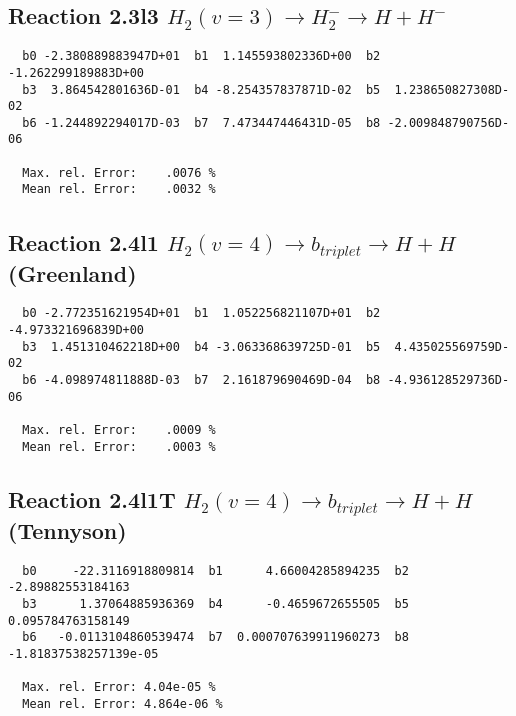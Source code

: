 \documentclass[12pt]{article}
\begin{document}
\subsection{
Reaction 2.3l3
 $ H_2(v=3) \rightarrow H_2^- \rightarrow H + H^-$
}


\begin{small}\begin{verbatim}
  b0 -2.380889883947D+01  b1  1.145593802336D+00  b2 -1.262299189883D+00
  b3  3.864542801636D-01  b4 -8.254357837871D-02  b5  1.238650827308D-02
  b6 -1.244892294017D-03  b7  7.473447446431D-05  b8 -2.009848790756D-06

  Max. rel. Error:    .0076 %
  Mean rel. Error:    .0032 %

\end{verbatim}\end{small}


\newpage
\subsection{
Reaction 2.4l1
$ H_2(v=4) \rightarrow b_{triplet}\rightarrow H + H $ (Greenland) 
}


\begin{small}\begin{verbatim}
  b0 -2.772351621954D+01  b1  1.052256821107D+01  b2 -4.973321696839D+00
  b3  1.451310462218D+00  b4 -3.063368639725D-01  b5  4.435025569759D-02
  b6 -4.098974811888D-03  b7  2.161879690469D-04  b8 -4.936128529736D-06

  Max. rel. Error:    .0009 %
  Mean rel. Error:    .0003 %

\end{verbatim}\end{small}



\subsection{
Reaction 2.4l1T
$  H_2(v=4) \rightarrow b_{triplet}\rightarrow H + H $ (Tennyson)
}


\begin{small}\begin{verbatim}
  b0     -22.3116918809814  b1      4.66004285894235  b2     -2.89882553184163
  b3      1.37064885936369  b4      -0.4659672655505  b5     0.095784763158149
  b6   -0.0113104860539474  b7  0.000707639911960273  b8 -1.81837538257139e-05

  Max. rel. Error: 4.04e-05 %
  Mean rel. Error: 4.864e-06 %
\end{verbatim}\end{small}
\end{document}
